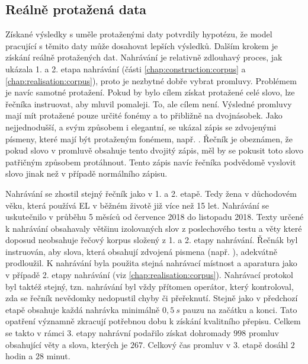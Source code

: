 
\subsection{Reálně protažená data}
\label{chap:realisation:augmentation:real}

Získané výsledky s uměle protaženými daty potvrdily hypotézu, že model pracující s těmito daty může dosahovat lepších výsledků. Dalším krokem je získání reálně protažených dat. Nahrávání je relativně zdlouhavý proces, jak ukázala 1. a 2. etapa nahrávání (části \ref{chap:construction:corpus} a \ref{chap:realisation:corpus}), proto je nezbytné dobře vybrat promluvy. Problémem je navíc samotné protažení. Pokud by bylo cílem získat protažené celé slovo, lze řečníka instruovat, aby mluvil pomaleji. To, ale cílem není. Výsledné promluvy mají mít protažené pouze určité fonémy a to přibližně na dvojnásobek. Jako nejjednodušší, a svým způsobem i elegantní, se ukázal zápis se zdvojenými písmeny, které mají být protaženým fonémem, např. . Řečník je obeznámen, že pokud slovo v promluvě obsahuje tento dvojitý zápis, měl by se pokusit toto slovo patřičným způsobem protáhnout. Tento zápis navíc řečníka podvědomě  vyslovit slovo jinak než v případě normálního zápisu.

Nahrávání se zhostil stejný řečník jako v 1. a 2. etapě. Tedy žena v důchodovém věku, která používá EL v běžném životě již více než 15 let. Nahrávání se uskutečnilo v průběhu 5 měsíců od července 2018 do listopadu 2018. Texty určené k nahrávání obsahavaly většinu izolovaných slov z poslechového testu a věty které doposud neobsahuje řečový korpus složený z 1. a 2. etapy nahrávání. Řečnák byl instruován, aby slova, která obsahují zdvojená pismena (např. ), adekvátně prodloužil. K nahrávání byla použita stejná nahrávací místnost a aparatura jako v případě 2. etapy nahrávání (viz \ref{chap:realisation:corpus}). Nahrávací protokol byl taktéž stejný, tzn. nahrávání byl vždy přítomen operátor, který kontroloval, zda se řečník nevědomky nedopustil chyby či přeřeknutí. Stejně jako v předchozí etapě obsahuje každá nahrávka minimálně $0,5\ s$ pauzu na začátku a konci. Tato opatření významně zkracují potřebnou dobu k získání kvalitního přepisu.
Celkem se takto v rámci 3. etapy nahrávní podařilo získat dohromady $998$ promluv obsahující věty a slova, kterých je $267$. Celkový čas promluv v 3. etapě dosáhl $2$ hodin a $28$ minut.

